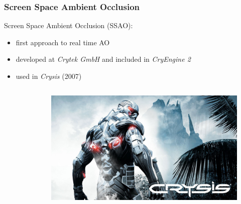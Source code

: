 \documentclass{beamer}
\begin{document}
\begin{frame}
\frametitle{Screen Space Ambient Occlusion}
Screen Space Ambient Occlusion (SSAO):
\begin{itemize}
    \item first approach to real time AO
    \item developed at \emph{Crytek GmbH} and included in \emph{CryEngine 2}
    \item used in \emph{Crysis} (2007)
\end{itemize}

\begin{columns}
    \begin{column}{0.4\linewidth}
        \begin{figure}
        \centering
         \\
        \end{figure}
    \end{column}

    \begin{column}{0.4\linewidth}
        \begin{figure}
        \centering
        \includegraphics[width=\linewidth]{images/crysis_cover.png}
        \end{figure}
    \end{column}
\end{columns}

\end{frame}
\end{document}
